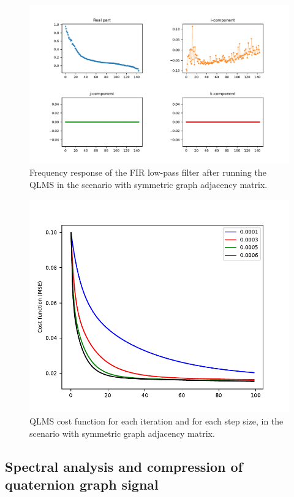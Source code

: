 \begin{figure}
    \centering
    \includegraphics[width=\linewidth]{Figures/uk_example/uk_qlm_filter_symmetric.pdf}
    \caption{Frequency response of the FIR low-pass filter after running the QLMS in the scenario with symmetric graph adjacency matrix.}
    \label{fig:uk_qlm_filter_symmetric}
\end{figure}
\renewcommand{\floatpagefraction}{.9}%
\begin{figure}
    \centering
    \includegraphics[width=0.58\linewidth]{Figures/uk_example/uk_qlms_iterations_symmetric.pdf}
    \caption{QLMS cost function for each iteration and for each step size, in the scenario with symmetric graph adjacency matrix.}
    \label{fig:uk_qlms_iterations_symmetric}
\end{figure}

\subsection{Spectral analysis and compression of quaternion graph signal}

